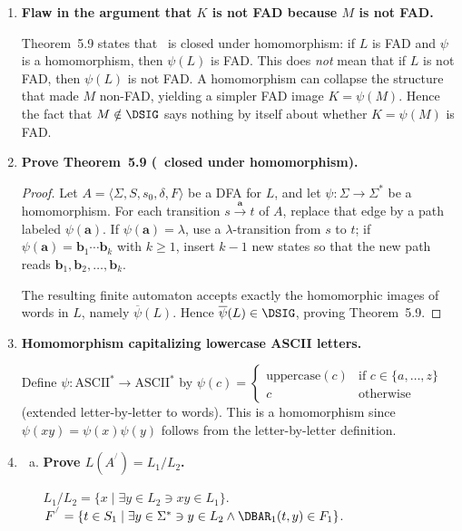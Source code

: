 \begin{enumerate}[{5.}1. ]
\item \textbf{Flaw in the argument that $K$ is not FAD because $M$ is not FAD.}

Theorem~5.9 states that \DSIG\ is closed under homomorphism: if $L$ is FAD and
$\psi$ is a homomorphism, then $\psi(L)$ is FAD.  This does \emph{not} mean that
if $L$ is not FAD, then $\psi(L)$ is not FAD.  A homomorphism can collapse the
structure that made $M$ non-FAD, yielding a simpler FAD image $K=\psi(M)$.
Hence the fact that $M\notin\DSIG$ says nothing by itself about whether
$K=\psi(M)$ is FAD.

\item \textbf{Prove Theorem~5.9 (\DSIG\ closed under homomorphism).}

\begin{proof}
Let $A=\langle\Sigma,S,s_0,\delta,F\rangle$ be a DFA for $L$, and let
$\psi:\Sigma\to\Sigma^*$ be a homomorphism.  For each transition
$s\xrightarrow{\pmb{a}}t$ of $A$, replace that edge by a path labeled
$\psi(\pmb{a})$.  If $\psi(\pmb{a})=\lambda$, use a $\lambda$-transition from
$s$ to $t$; if $\psi(\pmb{a})=\pmb{b}_1\cdots\pmb{b}_k$ with $k\ge 1$, insert
$k-1$ new states so that the new path reads
$\pmb{b}_1,\pmb{b}_2,\dots,\pmb{b}_k$.

The resulting finite automaton accepts exactly the homomorphic images of words in
$L$, namely $\overline{\psi}(L)$.  Hence $\overline{\psi}(L)\in\DSIG$, proving
Theorem~5.9.
\end{proof}

\item \textbf{Homomorphism capitalizing lowercase ASCII letters.}

Define $\psi:\text{ASCII}^*\to\text{ASCII}^*$ by
$\psi(c)=\begin{cases}\text{uppercase}(c) & \text{if }c\in\{a,\ldots,z\} \\ c & \text{otherwise}\end{cases}$
(extended letter-by-letter to words).  This is a homomorphism since $\psi(xy)=\psi(x)\psi(y)$ follows from the letter-by-letter definition.

\item \begin{enumerate}[(a)]
  \item \textbf{Prove $L(A^{^/})=L_1/L_2$.}

  $L_1/L_2=\{x\mid\exists y\in L_2\ni xy\in L_1\}$.
  $F^{^/}=\{t\in S_1\mid\exists y\in\Sigma^*\ni y\in L_2\wedge\DBAR_1(t,y)\in F_1\}$.


\end{enumerate}
\end{enumerate}
